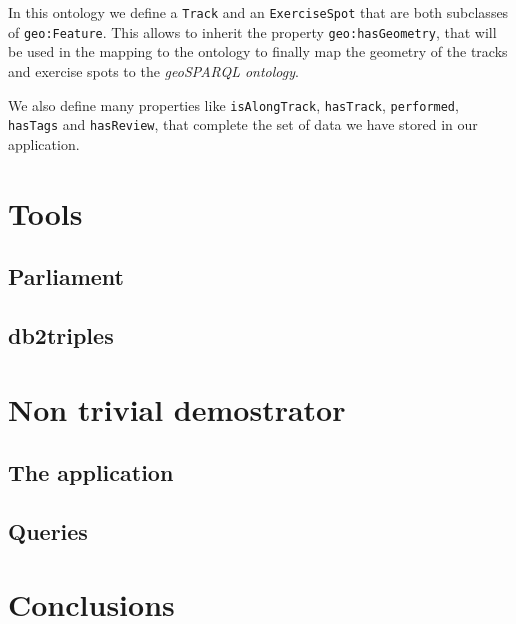 \documentclass[11pt,a4paper]{article}
\begin{document}
In this ontology we define a \texttt{Track} and an \texttt{ExerciseSpot} that are both subclasses of \texttt{geo:Feature}. This allows to inherit the property \texttt{geo:hasGeometry}, that will be used in the mapping to the ontology to finally map the geometry of the tracks and exercise spots to the \textit{geoSPARQL ontology}.

We also define many properties like \texttt{isAlongTrack}, \texttt{hasTrack}, \texttt{performed}, \texttt{hasTags} and \texttt{hasReview}, that complete the set of data we have stored in our application.

\section{Tools}
\subsection{Parliament}
\subsection{db2triples}
\section{Non trivial demostrator}
\subsection{The application}
\subsection{Queries}
\section{Conclusions}
\end{document}
